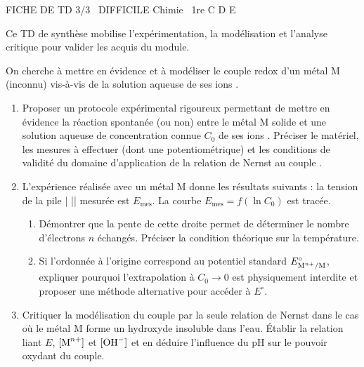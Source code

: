 \documentclass[11pt]{article}
\begin{document}
\begin{tcolorbox}[enhanced,colback=popink,colframe=popink,arc=10pt,boxrule=0pt,left=12pt,right=12pt,top=9pt,bottom=9pt]
{\color{white}\popxbold\small FICHE DE TD 3/3 \textbullet\ DIFFICILE \hfill Chimie \textbullet\ 1re C D E\par}
\end{tcolorbox}
\vspace{4pt}
Ce TD de synthèse mobilise l'expérimentation, la modélisation et l'analyse critique pour valider les acquis du module.

\begin{exercice}
On cherche à mettre en évidence et à modéliser le couple redox d'un métal M (inconnu) vis-à-vis de la solution aqueuse de ses ions .
\begin{enumerate}
    \item Proposer un protocole expérimental rigoureux permettant de mettre en évidence la réaction spontanée (ou non) entre le métal M solide et une solution aqueuse de concentration connue $C_0$ de ses ions . Préciser le matériel, les mesures à effectuer (dont une potentiométrique) et les conditions de validité du domaine d'application de la relation de Nernst au couple .
    \item L'expérience réalisée avec un métal M donne les résultats suivants : la tension de la pile  |  ||  mesurée est $E_{\text{mes}}$. La courbe $E_{\text{mes}} = f(\ln C_0)$ est tracée.
    \begin{enumerate}
        \item Démontrer que la pente de cette droite permet de déterminer le nombre d'électrons $n$ échangés. Préciser la condition théorique sur la température.
        \item Si l'ordonnée à l'origine correspond au potentiel standard $E^{\circ}_{\ce{M^{n+}/M}}$, expliquer pourquoi l'extrapolation à $C_0 \to 0$ est physiquement interdite et proposer une méthode alternative pour accéder à $E^{\circ}$.
    \end{enumerate}
    \item Critiquer la modélisation du couple  par la seule relation de Nernst dans le cas où le métal M forme un hydroxyde insoluble  dans l'eau. Établir la relation liant $E$, $[\ce{M^{n+}}]$ et $[\ce{OH-}]$ et en déduire l'influence du pH sur le pouvoir oxydant du couple.
\end{enumerate}
\end{exercice}
\end{document}
